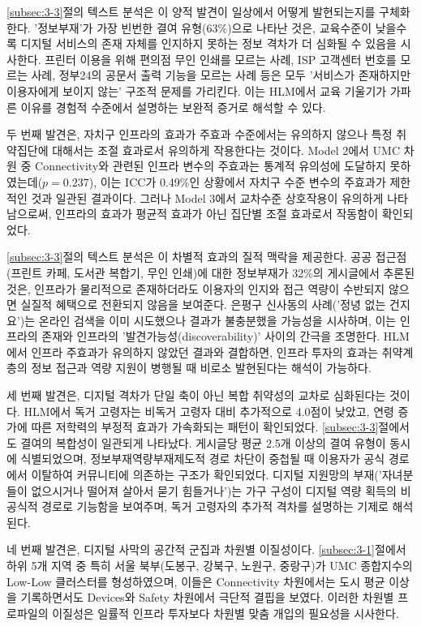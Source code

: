 \ref{subsec:3-3}절의 텍스트 분석은 이 양적 발견이 일상에서 어떻게 발현되는지를 구체화한다. '정보부재'가 가장 빈번한 결여 유형(63\%)으로 나타난 것은, 교육수준이 낮을수록 디지털 서비스의 존재 자체를 인지하지 못하는 정보 격차가 더 심화될 수 있음을 시사한다. 프린터 이용을 위해 편의점 무인 인쇄를 모르는 사례, ISP 고객센터 번호를 모르는 사례, 정부24의 공문서 출력 기능을 모르는 사례 등은 모두 '서비스가 존재하지만 이용자에게 보이지 않는' 구조적 문제를 가리킨다. 이는 HLM에서 교육 기울기가 가파른 이유를 경험적 수준에서 설명하는 보완적 증거로 해석할 수 있다.

두 번째 발견은, 자치구 인프라의 효과가 주효과 수준에서는 유의하지 않으나 특정 취약집단에 대해서는 조절 효과로서 유의하게 작용한다는 것이다. Model 2에서 UMC 차원 중 Connectivity와 관련된 인프라 변수의 주효과는 통계적 유의성에 도달하지 못하였는데($p = 0.237$), 이는 ICC가 0.49\%인 상황에서 자치구 수준 변수의 주효과가 제한적인 것과 일관된 결과이다. 그러나 Model 3에서 교차수준 상호작용이 유의하게 나타남으로써, 인프라의 효과가 평균적 효과가 아닌 집단별 조절 효과로서 작동함이 확인되었다.

\ref{subsec:3-3}절의 텍스트 분석은 이 차별적 효과의 질적 맥락을 제공한다. 공공 접근점(프린트 카페, 도서관 복합기, 무인 인쇄)에 대한 정보부재가 32\%의 게시글에서 추론된 것은, 인프라가 물리적으로 존재하더라도 이용자의 인지와 접근 역량이 수반되지 않으면 실질적 혜택으로 전환되지 않음을 보여준다. 은평구 신사동의 사례('정녕 없는 건지요')는 온라인 검색을 이미 시도했으나 결과가 불충분했을 가능성을 시사하며, 이는 인프라의 존재와 인프라의 '발견가능성(discoverability)' 사이의 간극을 조명한다. HLM에서 인프라 주효과가 유의하지 않았던 결과와 결합하면, 인프라 투자의 효과는 취약계층의 정보 접근과 역량 지원이 병행될 때 비로소 발현된다는 해석이 가능하다.

세 번째 발견은, 디지털 격차가 단일 축이 아닌 복합 취약성의 교차로 심화된다는 것이다. HLM에서 독거 고령자는 비독거 고령자 대비 추가적으로 4.0점이 낮았고, 연령 증가에 따른 저학력의 부정적 효과가 가속화되는 패턴이 확인되었다. \ref{subsec:3-3}절에서도 결여의 복합성이 일관되게 나타났다. 게시글당 평균 2.5개 이상의 결여 유형이 동시에 식별되었으며, 정보부재\textperiodcentered{}역량부재\textperiodcentered{}제도적 경로 차단이 중첩될 때 이용자가 공식 경로에서 이탈하여 커뮤니티에 의존하는 구조가 확인되었다. 디지털 지원망의 부재('자녀분들이 없으시거나 떨어져 살아서 묻기 힘들거나')는 가구 구성이 디지털 역량 획득의 비공식적 경로로 기능함을 보여주며, 독거 고령자의 추가적 격차를 설명하는 기제로 해석된다.

네 번째 발견은, 디지털 사막의 공간적 군집과 차원별 이질성이다. \ref{subsec:3-1}절에서 하위 5개 지역 중 특히 서울 북부(도봉구, 강북구, 노원구, 중랑구)가 UMC 종합지수의 Low-Low 클러스터를 형성하였으며, 이들은 Connectivity 차원에서는 도시 평균 이상을 기록하면서도 Devices와 Safety 차원에서 극단적 결핍을 보였다. 이러한 차원별 프로파일의 이질성은 일률적 인프라 투자보다 차원별 맞춤 개입의 필요성을 시사한다.

